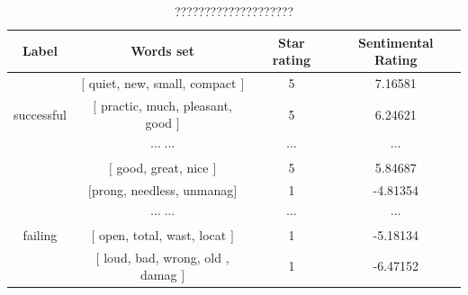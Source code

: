 \documentclass[12pt]{article}%
\begin{document}
\begin{table}[H]
	\centering
	\caption{????????????????????}	
	\begin{tabular}{c|ccc}
		\toprule[1.5pt]
		\multicolumn{1}{m{2cm}}{\centering Label} &
		\multicolumn{1}{m{6cm}}{\centering Words set} & \multicolumn{1}{m{2cm}}{\centering Star rating}&
		\multicolumn{1}{m{2cm}}{\centering  Sentimental Rating}\\
		\midrule[1pt]
		&$\big [$ quiet, new, small, compact $\big ]$ &5&7.16581\\
			successful	&$\big [$ practic, much, pleasant, good $\big ]$ &5&6.24621\\
				 	&$\cdots$ $\cdots$&$\cdots$&$\cdots$\\
	 	&$\big [$ good, great, nice $\big ]$ &5&5.84687\\
				\midrule[1pt]
		&$\big [$prong, needless, unmanag$\big ]$ &1&-4.81354\\
						 	&$\cdots$ $\cdots$&$\cdots$&$\cdots$\\
	failing	&$\big [$ open, total, wast, locat $\big ]$ &1&-5.18134\\
				&$\big [$ loud, bad, wrong, old , damag $\big ]$ &1&-6.47152\\
		\bottomrule[1.6pt]
	\end{tabular}\label{sssfff}
\end{table}
\end{document}
